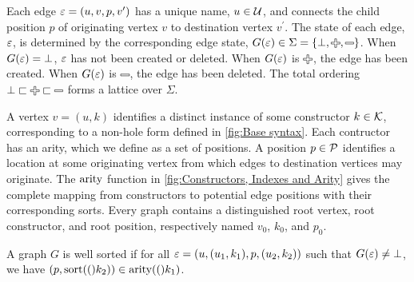 Each edge $\e = (u, v, p, v^\prime)$ has a unique name, $u \in \U$, and connects
the child position $p$ of originating vertex $v$ to destination vertex
$v^\prime$. The state of each edge, $\e$, is determined by the corresponding
edge state, $G(\e) \in \Sigma = \{ \bot, \Plus, \Minus \}$. When $G(\e) = \bot$,
$\e$ has not been created or deleted. When $G(\e)$ is $\Plus$, the edge has been
created. When $G(\e)$ is $\Minus$, the edge has been deleted. The total
ordering $\bot \sqsubset \Plus \sqsubset \Minus$ forms a lattice over $\Sigma$.

A vertex $v = (u, k)$ identifies a distinct instance of some constructor $k \in
\K$, corresponding to a non-hole form defined in \autoref{fig:Base syntax}. Each
contructor has an arity, which we define as a set of positions. A position $p
\in \P$ identifies a location at some originating vertex from which edges to
destination vertices may originate. The $\arityOp$ function in
\autoref{fig:Constructors, Indexes and Arity} gives the complete mapping from
constructors to potential edge positions with their corresponding sorts. Every
graph contains a distinguished root vertex, root constructor, and root position,
respectively named $v_0$, $k_0$, and $p_0$.

\vspace*{\baselineskip}



A graph $G$ is well sorted if
for all $\e = (u, (u_1, k_1), p, (u_2, k_2))$
such that $G(\e) \neq \bot$,
we have $(p, \sort(k_2)) \in \arity(k_1)$.




